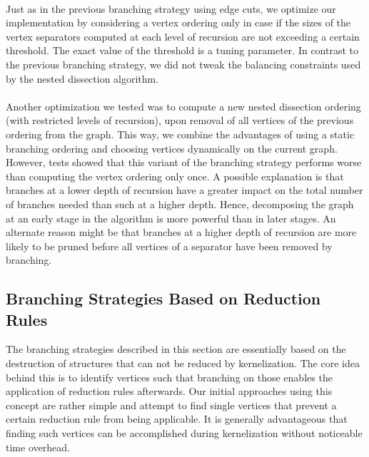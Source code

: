 \documentclass[]{article}
\begin{document}
\paragraph{}
Just as in the previous branching strategy using edge cuts, we optimize our implementation by considering a vertex ordering only in case if the sizes of the vertex separators computed at each level of recursion are not exceeding a certain threshold. The exact value of the threshold is a tuning parameter. In contrast to the previous branching strategy, we did not tweak the balancing constraints used by the nested dissection algorithm. 

\paragraph{}
Another optimization we tested was to compute a new nested dissection ordering (with restricted levels of recursion), upon removal of all vertices of the previous ordering from the graph. This way, we combine the advantages of using a static branching ordering and choosing vertices dynamically on the current graph.  However, tests showed that this variant of the branching strategy performs worse than computing the vertex ordering only once. A possible explanation is that branches at a lower depth of recursion have a greater impact on the total number of branches needed than such at a higher depth. Hence, decomposing the graph at an early stage in the algorithm is more powerful than in later stages. An alternate reason might be that branches at a higher depth of recursion are more likely to be pruned before all vertices of a separator have been removed by branching. 

\subsection{Branching Strategies Based on Reduction Rules} \label{red_strats}

The branching strategies described in this section are essentially based on the destruction of structures that can not be reduced by kernelization. The core idea behind this is to identify vertices such that branching on those enables the application of reduction rules afterwards. Our initial approaches using this concept are rather simple and attempt to find single vertices that prevent a certain reduction rule from being applicable. It is generally advantageous that finding such vertices can be accomplished during kernelization without noticeable time overhead.
\end{document}

